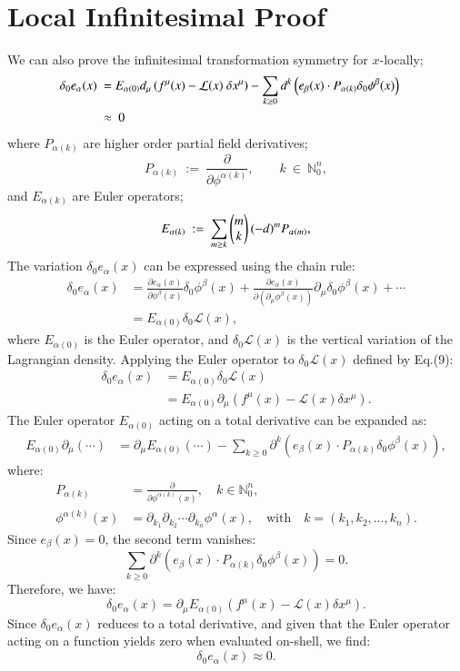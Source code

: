 \documentclass{article}
\begin{document}
\section{Local Infinitesimal Proof}
We can also prove the infinitesimal transformation symmetry for $x$-locally;
	\begin{align}  \delta_0 e_{\alpha}(x)~&= E_{\alpha(0)} d_{\mu}\left(f^{\mu}(x)-{\cal L}(x)~\delta x^{\mu}\right) - \sum_{k\geq 0} d^k\left( e_{\beta}(x) \cdot P_{\alpha(k)}\delta_0\phi^{\beta}(x) \right)\cr
~&\approx~ 0  \end{align}
where $P_{\alpha(k)}$ are higher order partial field derivatives;
\[
	P_{\alpha(k)} ~:=~\frac{\partial  }{\partial \phi^{\alpha(k)}}, \qquad k~\in~\mathbb{N}_0^n,
\]
and $E_{\alpha(k)}$ are Euler operators;
\[
E_{\alpha(k)} ~:=~\sum_{m\geq k}
\begin{pmatrix} m \cr k\end{pmatrix}
(-d)^m P_{\alpha(m)},
\]
The variation \( \delta_0 e_\alpha(x) \) can be expressed using the chain rule:
\begin{align*}
\delta_0 e_\alpha(x) &= \frac{\partial e_\alpha(x)}{\partial \phi^\beta(x)} \delta_0 \phi^\beta(x) + \frac{\partial e_\alpha(x)}{\partial (\partial_\mu \phi^\beta(x))} \partial_\mu \delta_0 \phi^\beta(x) + \cdots \nonumber \\
&= E_{\alpha(0)} \delta_0 \mathcal{L}(x),
\end{align*}
where \( E_{\alpha(0)} \) is the Euler operator, and \( \delta_0 \mathcal{L}(x) \) is the vertical variation of the Lagrangian density. Applying the Euler operator to \( \delta_0 \mathcal{L}(x) \) defined by Eq.(9):
\begin{align*}
\delta_0 e_\alpha(x) &= E_{\alpha(0)} \delta_0 \mathcal{L}(x) \nonumber \\
&= E_{\alpha(0)} \partial_\mu \left( f^\mu(x) - \mathcal{L}(x) \delta x^\mu \right).
\end{align*}
The Euler operator \( E_{\alpha(0)} \) acting on a total derivative can be expanded as:
\begin{align*}
E_{\alpha(0)} \partial_\mu (\cdots) &= \partial_\mu E_{\alpha(0)} (\cdots) - \sum_{k \geq 0} \partial^k \left( e_\beta(x) \cdot P_{\alpha(k)} \delta_0 \phi^\beta(x) \right),
\end{align*}
where:
\begin{align*}
P_{\alpha(k)} &= \frac{\partial}{\partial \phi^{\alpha(k)}(x)}, \quad k \in \mathbb{N}_0^n, \\
\phi^{\alpha(k)}(x) &= \partial_{k_1} \partial_{k_2} \cdots \partial_{k_n} \phi^\alpha(x), \quad \text{with} \quad k = (k_1, k_2, \ldots, k_n).
\end{align*}
Since \( e_\beta(x) = 0 \), the second term vanishes:
\[
\sum_{k \geq 0} \partial^k \left( e_\beta(x) \cdot P_{\alpha(k)} \delta_0 \phi^\beta(x) \right) = 0.
\]
Therefore, we have:
\[
\delta_0 e_\alpha(x) = \partial_\mu E_{\alpha(0)} \left( f^\mu(x) - \mathcal{L}(x) \delta x^\mu \right).
\]
Since \( \delta_0 e_\alpha(x) \) reduces to a total derivative, and given that the Euler operator acting on a function yields zero when evaluated on-shell, we find:
\[
\delta_0 e_\alpha(x) \approx 0.
\]


\printbibliography
\end{document}
